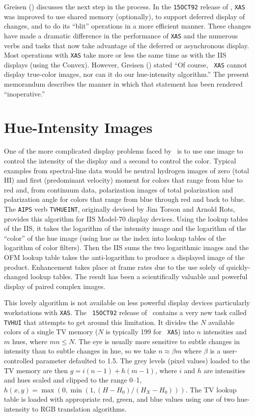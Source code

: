      Greisen (\cite{kn:gre2}) discusses the next step in the process.
In the {\tt 15OCT92} release of \AIPS, {\tt XAS} was improved to use
shared memory (optionally), to support deferred display of changes,
and to do its ``blit'' operations in a more efficient manner.  These
changes have made a dramatic difference in the performance of {\tt XAS}
and the numerous verbs and tasks that now take advantage of the
deferred or asynchronous display.  Most operations with {\tt XAS} take
more or less the same time as with the IIS displays (using the
Convex). However, Greisen (\cite{kn:gre2}) stated ``Of course, {\tt
XAS} cannot display true-color images, nor can it do our hue-intensity
algorithm.''  The present memorandum describes the manner in which
that statement has been rendered ``inoperative.''

\section{Hue-Intensity Images}

     One of the more complicated display problems faced by \AIPS\ is
to use one image to control the intensity of the display and a second
to control the color.  Typical examples from spectral-line data would
be neutral hydrogen images of zero (total HI) and first (predominant
velocity) moment for colors that range from blue to red and, from
continuum data, polarization images of total polarization and
polarization angle for colors that range from blue through red and
back to blue.  The {\tt AIPS} verb {\tt TVHUEINT}, originally devised
by Jim Torson and Arnold Rots, provides this algorithm for IIS
Model-70 display devices.  Using the lookup tables of the IIS, it
takes the logarithm of the intensity image and the logarithm of the
``color'' of the hue image (using hue as the index into lookup tables
of the logarithm of color filters).  Then the IIS sums the two
logarithmic images and the OFM lookup table takes the anti-logarithm
to produce a displayed image of the product.  Enhancement takes place
at frame rates due to the use solely of quickly-changed lookup tables.
The result has been a scientifically valuable and powerful display of
paired complex images.

     This lovely algorithm is not available on less powerful display
devices particularly workstations with \hbox{{\tt XAS}}.  The {\tt
15OCT92} release of \AIPS\ contains a very new task called {\tt TVHUI}
that attempts to get around this limitation.  It divides the $N$
available colors of a single TV memory ($N$ is typically 199 for {\tt
XAS}) into $n$ intensities and $m$ hues, where $m n \leq N$.  The eye
is usually more sensitive to subtle changes in intensity than to
subtle changes in hue, so we take $n \approx \beta m$ where $\beta$ is
a user-controlled parameter defaulted to 1.5.  The grey levels (pixel
values) loaded to the TV memory are then $g = i (n-1) + h (m-1)$,
where $i$ and $h$ are intensities and hues scaled and clipped to the
range 0--1, \eg\ $h(x,y) = \max (0, \min (1, (H - H_0) / (H_X - H_0)
))$.  The TV lookup table is loaded with appropriate red, green, and
blue values using one of two hue-intensity to RGB translation
algorithms.

